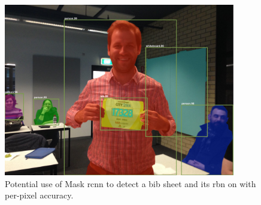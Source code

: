 \begin{figure}
  \centering
  \includegraphics[width=0.9\textwidth]{images/conclusion/mask-rcnn}
  \caption[Potential use of Mask-RCNN on to recognise an RBN]{Potential use of Mask \gls{rcnn} to detect a bib sheet and its \gls{rbn} on with per-pixel accuracy.}
  \label{fig:conclusion:future_work:mask_rcnn}
\end{figure}